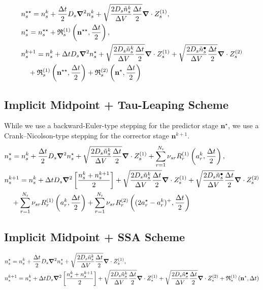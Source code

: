 \documentclass[final]{siamltex}
\newcommand{\nb}{\mathbf{n}}
\begin{document}
\begin{subequations}
\begin{align}
&\ns^{\star\star} = \ns^k + \dthalf\Ds\nablab^2\ns^k 
+\sqrt{\frac{2\Ds\tn_s^k}{\dV}\dthalf} \nablab\cdot Z_s^\pone,\\
&\ns^\star = \ns^{\star\star} + \Rfrak_s^\pone\left(\nb^{\star\star},\dthalf\right),\\
&\ns^{k+1} = n_s^k + \dt\Ds\nablab^2 n_s^\star
+\sqrt{\frac{2\Ds\tn_s^k}{\dV}\dthalf} \nablab\cdot Z_s^\pone
+\sqrt{\frac{2\Ds\tn_s^\bullet}{\dV}\dthalf} \nablab\cdot Z_s^\ptwo\\
&\quad+\Rfrak_s^\pone\left(\nb^{\star\star},\dthalf\right)
+\Rfrak_s^\ptwo\left(\nb^\star,\dthalf\right)\notag
\end{align}
\end{subequations}

\subsection{Implicit Midpoint + Tau-Leaping Scheme}

While we use a backward-Euler-type stepping for the predictor stage $\nb^\star$, we use a Crank--Nicolson-type stepping for the corrector stage $\nb^{k+1}$.
\begin{subequations}
\begin{align}
&n_s^\star = n_s^k + {\frac{{\Delta t}}{2}}{D_s}\bm{\nabla}^2n_s^\star
+\sqrt{\frac{2{D_s}\tilde{n}_s^k}{{\Delta V}}{\frac{{\Delta t}}{2}}}\bm{\nabla}\cdot Z_s^{(1)}
+\sum_{r=1}^{N_\mathrm{r}} {\nu_{s r}} R_r^{(1)}\left(a_r^k,{\frac{{\Delta t}}{2}}\right),\\
&n_s^{k+1} = n_s^k + {\Delta t}{D_s}\bm{\nabla}^2 \left[\frac{n_s^k+n_s^{k+1}}{2}\right]
+\sqrt{\frac{2{D_s}\tilde{n}_s^k}{{\Delta V}}{\frac{{\Delta t}}{2}}} \bm{\nabla}\cdot Z_s^{(1)}
+\sqrt{\frac{2{D_s}\tilde{n}_s^\bullet}{{\Delta V}}{\frac{{\Delta t}}{2}}} \bm{\nabla}\cdot Z_s^{(2)}\\
&\quad+\sum_{r=1}^{N_\mathrm{r}} {\nu_{s r}} R_r^{(1)}\left(a_r^k,{\frac{{\Delta t}}{2}}\right)
+\sum_{r=1}^{N_\mathrm{r}} {\nu_{s r}} R_r^{(2)}\left((2a_r^\star-a_r^k)^+,{\frac{{\Delta t}}{2}}\right)\notag
\end{align}
\end{subequations}

\subsection{Implicit Midpoint + SSA Scheme}

\begin{subequations}
\begin{align}
&\ns^\star = \ns^k + \dthalf\Ds\nablab^2\ns^\star
+\sqrt{\frac{2\Ds\tn_s^k}{\dV}\dthalf} \nablab\cdot Z_s^\pone,\\
&\ns^{k+1} = \ns^k + \dt\Ds\nablab^2 \left[\frac{n_s^k+n_s^{k+1}}{2}\right]
+\sqrt{\frac{2\Ds\tn_s^k}{\dV}\dthalf} \nablab\cdot Z_s^\pone
+\sqrt{\frac{2\Ds\tn_s^\bullet}{\dV}\dthalf} \nablab\cdot Z_s^\ptwo
+\Rfrak_s^\pone\left(\nb^\star,\dt\right)
\end{align}
\end{subequations}
\end{document}
